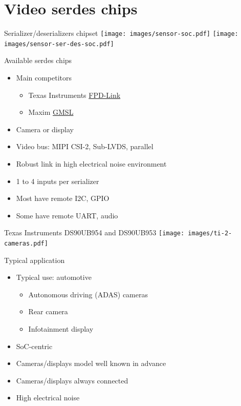 \documentclass[xetex,table,aspectratio=169]{beamer}
\begin{document}
\section{Video serdes chips}

\begin{frame}{Serializer/deserializers chipset}
  \center\texttt{[image: images/sensor-soc.pdf]}
  \pause
  \center\texttt{[image: images/sensor-ser-des-soc.pdf]}
\end{frame}

\begin{frame}{Available serdes chips}
  \begin{itemize}
  \item Main competitors
    \begin{itemize}
    \item Texas Instruments
      \href{http://www.ti.com/interface/fpd-link-serdes/products.html}{FPD-Link}
    \item Maxim
      \href{https://www.maximintegrated.com/en/products/interface/high-speed-signaling/gmsl-serdes.html}{GMSL}
    \end{itemize}
  \item Camera or display
  \item Video bus: MIPI CSI-2, Sub-LVDS, parallel
  \item Robust link in high electrical noise environment
  \item 1 to 4 inputs per serializer
  \item Most have remote I2C, GPIO
  \item Some have remote UART, audio
  \end{itemize}
\end{frame}

\begin{frame}{Texas Instruments DS90UB954 and DS90UB953}
  \center\texttt{[image: images/ti-2-cameras.pdf]}
\end{frame}

\begin{frame}{Typical application}
  \begin{itemize}
  \item Typical use: automotive
    \begin{itemize}
    \item Autonomous driving (ADAS) cameras
    \item Rear camera
    \item Infotainment display
    \end{itemize}
  \item SoC-centric
  \item Cameras/displays model well known in advance
  \item Cameras/displays always connected
  \item High electrical noise
  \end{itemize}
\end{frame}
\end{document}
